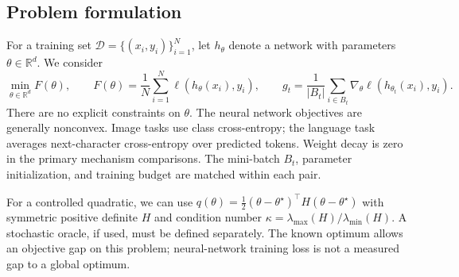 \subsection{Problem formulation}
For a training set $\mathcal D=\{(x_i,y_i)\}_{i=1}^N$, let $h_\theta$ denote a network
with parameters $\theta\in\mathbb R^d$. We consider
\begin{equation}\label{eq:objective}
\min_{\theta\in\mathbb R^d} F(\theta),\qquad
F(\theta)=\frac1N\sum_{i=1}^N\ell(h_\theta(x_i),y_i),\qquad
g_t=\frac1{|B_t|}\sum_{i\in B_t}\nabla_\theta\ell(h_{\theta_t}(x_i),y_i).
\end{equation}
There are no explicit constraints on $\theta$. The neural network objectives are generally
nonconvex. Image tasks use class cross-entropy; the language task averages next-character
cross-entropy over predicted tokens. Weight decay is zero in the primary mechanism comparisons.
The mini-batch $B_t$, parameter initialization, and training budget are matched within each pair.

For a controlled quadratic, we can use $q(\theta)=\frac12(\theta-\theta^\star)^\top
H(\theta-\theta^\star)$ with symmetric positive definite $H$ and condition number
$\kappa=\lambda_{\max}(H)/\lambda_{\min}(H)$. A stochastic oracle, if used, must be defined
separately. The known optimum allows an objective gap on this problem; neural-network training
loss is not a measured gap to a global optimum.
